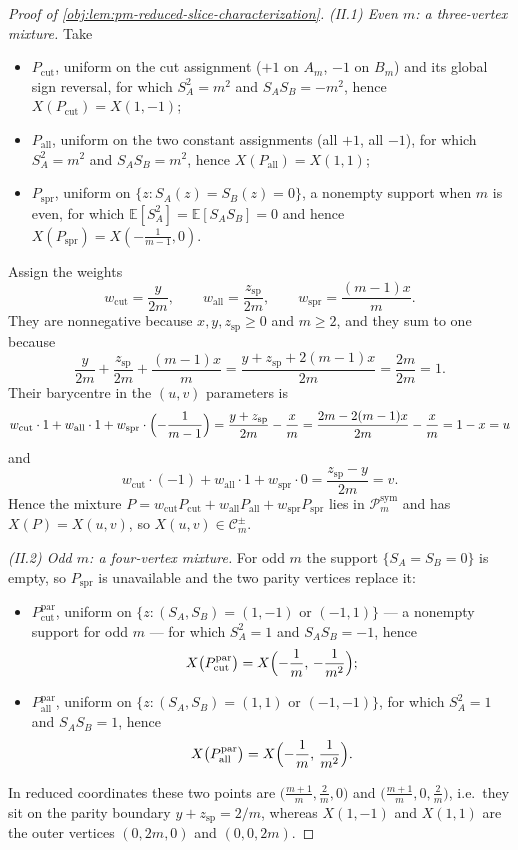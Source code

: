 \begin{proof}[Proof of \cref{obj:lem:pm-reduced-slice-characterization}]
\emph{(II.1) Even \(m\): a three-vertex mixture.}  Take
\begin{itemize}
\item \(P_{\mathrm{cut}}\), uniform on the cut assignment (\(+1\) on \(A_m\), \(-1\) on \(B_m\)) and its global sign reversal, for which \(S_A^2=m^2\) and \(S_AS_B=-m^2\), hence \(X(P_{\mathrm{cut}})=X(1,-1)\); %
\item \(P_{\mathrm{all}}\), uniform on the two constant assignments (all \(+1\), all \(-1\)), for which \(S_A^2=m^2\) and \(S_AS_B=m^2\), hence \(X(P_{\mathrm{all}})=X(1,1)\); %
\item \(P_{\mathrm{spr}}\), uniform on \(\{z:S_A(z)=S_B(z)=0\}\), a nonempty support when \(m\) is even, for which \(\mathbb E[S_A^2]=\mathbb E[S_AS_B]=0\) and hence \(X(P_{\mathrm{spr}})=X\!\left(-\tfrac{1}{m-1},0\right)\). %
\end{itemize}
Assign the weights
\[
w_{\mathrm{cut}}=\frac{y}{2m},
\qquad
w_{\mathrm{all}}=\frac{z_{\mathrm{sp}}}{2m},
\qquad
w_{\mathrm{spr}}=\frac{(m-1)x}{m}.
\]
They are nonnegative because \(x,y,z_{\mathrm{sp}}\ge0\) and \(m\ge2\), and they sum to one because
\[
\frac{y}{2m}+\frac{z_{\mathrm{sp}}}{2m}+\frac{(m-1)x}{m}
=\frac{y+z_{\mathrm{sp}}+2(m-1)x}{2m}
=\frac{2m}{2m}=1 .
\]
Their barycentre in the \((u,v)\) parameters is
\[
w_{\mathrm{cut}}\cdot1+w_{\mathrm{all}}\cdot1+w_{\mathrm{spr}}\cdot\Bigl(-\frac{1}{m-1}\Bigr)
=\frac{y+z_{\mathrm{sp}}}{2m}-\frac{x}{m}
=\frac{2m-2(m-1)x}{2m}-\frac{x}{m}
=1-x=u
\]
and
\[
w_{\mathrm{cut}}\cdot(-1)+w_{\mathrm{all}}\cdot1+w_{\mathrm{spr}}\cdot0
=\frac{z_{\mathrm{sp}}-y}{2m}=v .
\]
Hence the mixture \(P=w_{\mathrm{cut}}P_{\mathrm{cut}}+w_{\mathrm{all}}P_{\mathrm{all}}+w_{\mathrm{spr}}P_{\mathrm{spr}}\) lies in \(\mathcal P_m^{\mathrm{sym}}\) and has \(X(P)=X(u,v)\), so \(X(u,v)\in\mathcal C_m^{\pm}\). %

\emph{(II.2) Odd \(m\): a four-vertex mixture.}  For odd \(m\) the support \(\{S_A=S_B=0\}\) is empty, so \(P_{\mathrm{spr}}\) is unavailable and the two parity vertices replace it:
\begin{itemize}
\item \(P^{\mathrm{par}}_{\mathrm{cut}}\), uniform on \(\{z:(S_A,S_B)=(1,-1)\text{ or }(-1,1)\}\) --- a nonempty support for odd \(m\) --- for which \(S_A^2=1\) and \(S_AS_B=-1\), hence
\[
X\bigl(P^{\mathrm{par}}_{\mathrm{cut}}\bigr)=X\Bigl(-\frac1m,\,-\frac1{m^2}\Bigr);
\]
\item \(P^{\mathrm{par}}_{\mathrm{all}}\), uniform on \(\{z:(S_A,S_B)=(1,1)\text{ or }(-1,-1)\}\), for which \(S_A^2=1\) and \(S_AS_B=1\), hence
\[
X\bigl(P^{\mathrm{par}}_{\mathrm{all}}\bigr)=X\Bigl(-\frac1m,\,\frac1{m^2}\Bigr).
\]
\end{itemize}
In reduced coordinates these two points are \(\bigl(\tfrac{m+1}{m},\tfrac2m,0\bigr)\) and \(\bigl(\tfrac{m+1}{m},0,\tfrac2m\bigr)\), i.e.\ they sit on the parity boundary \(y+z_{\mathrm{sp}}=2/m\), whereas \(X(1,-1)\) and \(X(1,1)\) are the outer vertices \((0,2m,0)\) and \((0,0,2m)\).


\end{proof}
